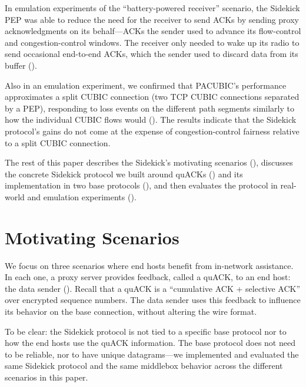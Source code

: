 In emulation experiments of the ``battery-powered receiver'' scenario,
the Sidekick PEP was able to reduce the need for the receiver to send ACKs
by sending proxy acknowledgments on its behalf---ACKs the sender used
to advance its flow-control and congestion-control windows. The
receiver only needed to wake up its radio to send occasional
end-to-end ACKs, which the sender used to discard data from its
buffer ().

Also in an emulation experiment, we confirmed that PACUBIC's
performance approximates a split CUBIC connection (two TCP CUBIC
connections separated by a PEP), responding to loss events on the
different path segments similarly to how the individual CUBIC flows would
(). The results indicate that the Sidekick protocol's gains
do not come at the
expense of congestion-control fairness relative to a split CUBIC connection.

\smallskip

The rest of this paper describes the Sidekick's motivating scenarios
(), discusses the concrete Sidekick protocol we
built around quACKs () and its implementation in two
base protocols (), and then evaluates the
protocol in real-world and emulation experiments
().

\section{Motivating Scenarios}
\label{sec:sidekick:motivating}



We focus on three scenarios where end hosts benefit from in-network assistance.
In each one, a proxy server provides feedback, called a quACK, to an end host:
the data sender (). Recall that a quACK is a
``cumulative ACK + selective ACK'' over encrypted sequence numbers. The data
sender uses this feedback to influence its behavior on the base connection,
without altering the wire format.

To be clear: the Sidekick protocol is not tied to a specific base protocol
nor to how the end hosts use the quACK information. The base protocol does not
need to be reliable, nor to have unique datagrams---we implemented and evaluated
the same Sidekick protocol and the same middlebox behavior across the different
scenarios in this paper.

